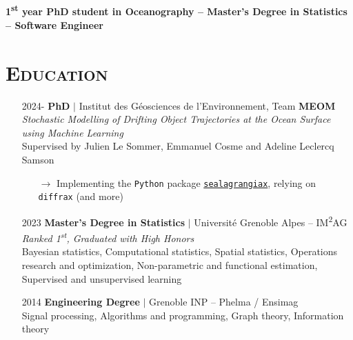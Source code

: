 \documentclass{article}
\begin{document}
\\[.1 cm]

\begin{center}
    \large{\textbf{1\textsuperscript{st} year PhD student in Oceanography – Master's Degree in Statistics – Software Engineer}}
\end{center}

\section*{\textsc{Education}}
\begin{itemize}
    \item[] 2024- \tabto{2cm} \textbf{PhD} $\vert$ Institut des Géosciences de l'Environnement, Team \textbf{MEOM} \\[.1 cm]
    \tabto{2cm} \textit{Stochastic Modelling of Drifting Object Trajectories at the Ocean Surface using Machine Learning} \\[.1 cm]
    \tabto{2cm} Supervised by Julien Le Sommer, Emmanuel Cosme and Adeline Leclercq Samson
    \vspace{-.1 cm}
    \begin{itemize}[left=2cm]
        \item[$\rightarrow$] Implementing the \texttt{Python} package \href{https://gitfront.io/r/vadmbertr/9qHVDfXFk3pZ/sealagrangiax/}{\texttt{sealagrangiax}}, relying on \texttt{diffrax} (and more)
    \end{itemize}
    \item[] 2023 \tabto{2cm} \textbf{Master’s Degree in Statistics} $\vert$ Université Grenoble Alpes – IM\textsuperscript{2}AG \\[.15 cm]
    \tabto{2cm} \textit{Ranked 1\textsuperscript{st}, Graduated with High Honors} \\[.1 cm]
    \tabto{2cm} Bayesian statistics, Computational statistics, Spatial statistics, Operations research and optimization, \tabto{2cm} Non-parametric and functional estimation, Supervised and unsupervised learning
    \item[] 2014 \tabto{2cm} \textbf{Engineering Degree} $\vert$ Grenoble INP – Phelma / Ensimag \\[.1 cm]
    \tabto{2cm} Signal processing, Algorithms and programming, Graph theory, Information theory
\end{itemize}
\end{document}
